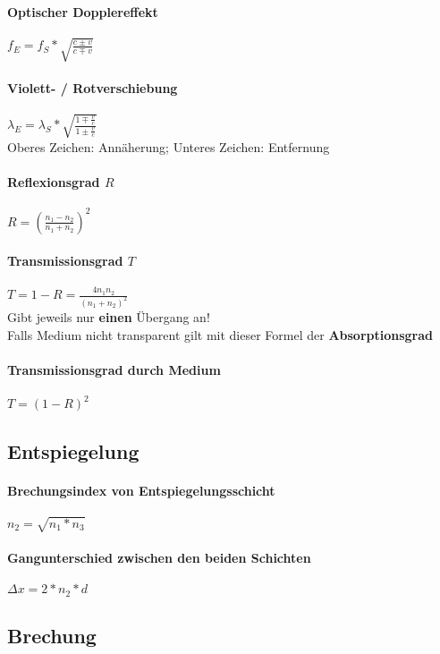 \documentclass[a4paper, 12pt]{scrreprt}
\begin{document}
\paragraph{Optischer Dopplereffekt} \dotfill \(f_E = f_S* \sqrt{\frac{c \pm v}{c \mp v}}\)
\paragraph{Violett- / Rotverschiebung} \dotfill \(\lambda_E = \lambda_S*\sqrt{\frac{1 \mp \frac{v}{c}}{1 \pm \frac{v}{c}}}\)\\
\myhspace \textcolor{myred}{Oberes Zeichen: Annäherung; Unteres Zeichen: Entfernung}
\paragraph{Reflexionsgrad \(R\)} \dotfill \(R = {\left( \frac{n_1 - n_2}{n_1 + n_2} \right)}^2\)
\paragraph{Transmissionsgrad \(T\)} \dotfill \(T = 1 - R = \frac{4 n_1 n_2}{{(n_1 + n_2)}^2}\)\\
\myhspace Gibt jeweils nur \textbf{einen} Übergang an!\\
\myhspace Falls Medium nicht transparent gilt mit dieser Formel der \textbf{Absorptionsgrad}
\paragraph{Transmissionsgrad \textbf{durch} Medium} \dotfill \(T = {(1 - R)}^2\)

\subsection{Entspiegelung}
\paragraph{Brechungsindex von Entspiegelungsschicht} \dotfill \(n_2 = \sqrt{n_1 * n_3}\)
\paragraph{Gangunterschied zwischen den beiden Schichten} \dotfill \(\Delta x = 2 * n_2 * d\)


\subsection*{Brechung}
\end{document}
